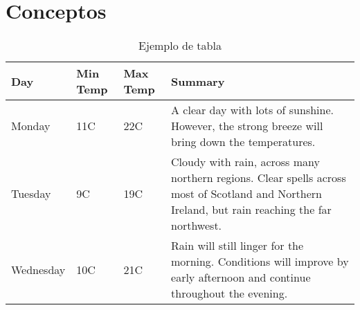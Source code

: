 \fontsize{12}{12}\selectfont
\chapter{Conceptos}


\begin{table}[!ht]
	\begin{tabular}{| l | l | l | l |}
		\hline
		Day & Min Temp & Max Temp & Summary \\ \hline
		Monday & 11C & 22C & A clear day with lots of sunshine.
		However, the strong breeze will bring down the temperatures. \\ \hline
		Tuesday & 9C & 19C & Cloudy with rain, across many northern regions. Clear spells 
		across most of Scotland and Northern Ireland, 
		but rain reaching the far northwest. \\ \hline
		Wednesday & 10C & 21C & Rain will still linger for the morning. 
		Conditions will improve by early afternoon and continue 
		throughout the evening. \\
		\hline
	\end{tabular}
	\caption{Ejemplo de tabla}
	\label{tab:testtab1}
\end{table}

